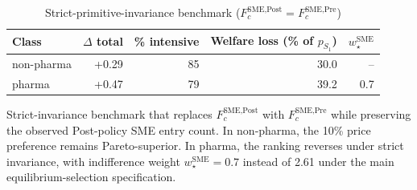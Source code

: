 \begin{table}[htbp]
\centering
\begin{threeparttable}
\caption{Strict-primitive-invariance benchmark ($F_c^{\text{SME,Post}} = F_c^{\text{SME,Pre}}$)}
\label{tab:v3_strict_invariance}
\small
\begin{tabular}{lrrrr}
\toprule
Class & $\Delta$ total & \% intensive & Welfare loss (\% of $p_{S_1}$) & $w^{\text{SME}}_\star$ \\
\midrule
non-pharma & +0.29 & 85 & 30.0 & -- \\
pharma & +0.47 & 79 & 39.2 & 0.7 \\
\bottomrule
\end{tabular}
\begin{tablenotes}\footnotesize
\item Strict-invariance benchmark that replaces $F_c^{\text{SME,Post}}$
with $F_c^{\text{SME,Pre}}$ while preserving the observed Post-policy
SME entry count. In non-pharma, the 10\% price preference remains
Pareto-superior. In pharma, the ranking reverses under strict
invariance, with indifference weight $w^{\text{SME}}_\star = 0.7$
instead of 2.61 under the main equilibrium-selection specification.
\end{tablenotes}
\end{threeparttable}
\end{table}
